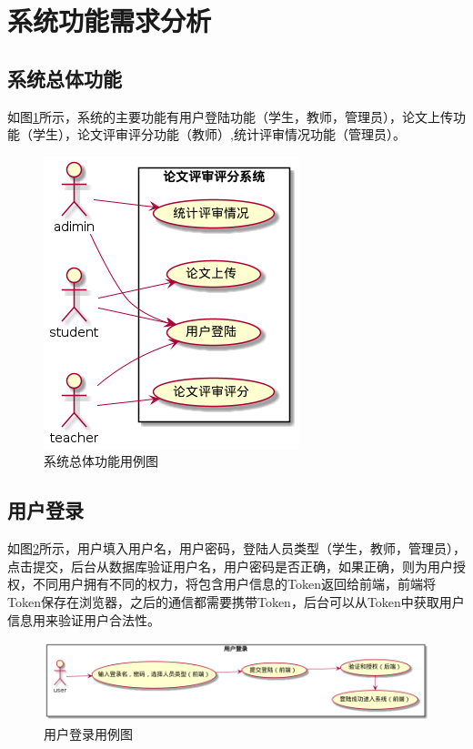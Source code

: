\section{系统功能需求分析}

\subsection{系统总体功能}

如图\ref{system-usecase}所示，系统的主要功能有用户登陆功能（学生，教师，管理员），论文上传功能（学生），论文评审评分功能（教师）,统计评审情况功能（管理员）。

\begin{figure}[htbp]
    \centering
    \includegraphics[scale = 0.6]{out/uml/用例图/系统总体功能用例图/系统总体功能用例图.png}
    \caption{\song\wuhao 系统总体功能用例图}
    \label{system-usecase}
\end{figure}

\subsection{用户登录}

如图\ref{login-usecase}所示，用户填入用户名，用户密码，登陆人员类型（学生，教师，管理员），点击提交，后台从数据库验证用户名，用户密码是否正确，如果正确，则为用户授权，不同用户拥有不同的权力，将包含用户信息的Token返回给前端，前端将Token保存在浏览器，之后的通信都需要携带Token，后台可以从Token中获取用户信息用来验证用户合法性。

\begin{figure}[htbp]
    \centering
    \includegraphics[scale = 0.45]{out/uml/用例图/1-用户登录用例图/1-用户登录用例图.png}
    \caption{\song\wuhao 用户登录用例图}
    \label{login-usecase}
\end{figure}

